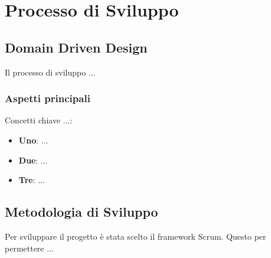 \chapter{Processo di Sviluppo}

\section{Domain Driven Design}
Il processo di sviluppo ...
    \subsection{Aspetti principali}

    
    Concetti chiave ...:
    
        \begin{itemize}
        \item \textbf{Uno}: ...
        \item \textbf{Due}: ...
        \item \textbf{Tre}: ...
       
        
    \end{itemize}

 

\section{Metodologia di Sviluppo}
Per sviluppare il progetto è stata scelto il framework Scrum. Questo per permettere ... 

